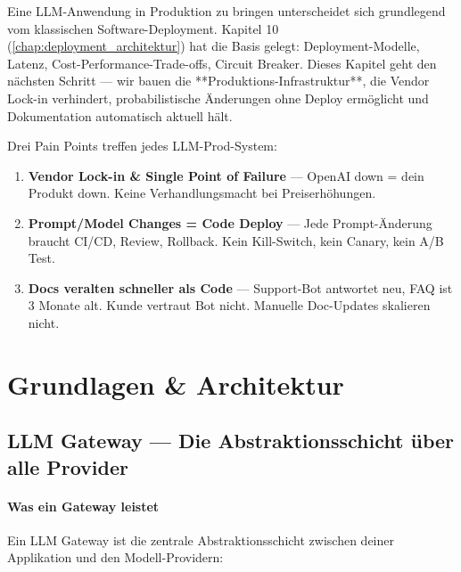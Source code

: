Eine LLM-Anwendung in Produktion zu bringen unterscheidet sich grundlegend vom klassischen Software-Deployment. Kapitel 10 (\ref{chap:deployment_architektur}) hat die Basis gelegt: Deployment-Modelle, Latenz, Cost-Performance-Trade-offs, Circuit Breaker. Dieses Kapitel geht den nächsten Schritt — wir bauen die **Produktions-Infrastruktur**, die Vendor Lock-in verhindert, probabilistische Änderungen ohne Deploy ermöglicht und Dokumentation automatisch aktuell hält.

Drei Pain Points treffen jedes LLM-Prod-System:

\begin{enumerate}[leftmargin=*]
    \item \textbf{Vendor Lock-in \& Single Point of Failure} — OpenAI down = dein Produkt down. Keine Verhandlungsmacht bei Preiserhöhungen.
    \item \textbf{Prompt/Model Changes = Code Deploy} — Jede Prompt-Änderung braucht CI/CD, Review, Rollback. Kein Kill-Switch, kein Canary, kein A/B Test.
    \item \textbf{Docs veralten schneller als Code} — Support-Bot antwortet neu, FAQ ist 3 Monate alt. Kunde vertraut Bot nicht. Manuelle Doc-Updates skalieren nicht.
\end{enumerate}


\section{Grundlagen \& Architektur}

\subsection{LLM Gateway — Die Abstraktionsschicht über alle Provider}

\paragraph{Was ein Gateway leistet}
Ein LLM Gateway ist die zentrale Abstraktionsschicht zwischen deiner Applikation und den Modell-Providern:

